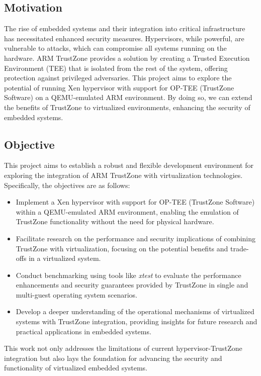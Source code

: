 \documentclass[acmtog]{acmart}
\begin{document}
\subsection{Motivation}
The rise of embedded systems and their integration into critical infrastructure has necessitated enhanced security measures. Hypervisors, while powerful, are vulnerable to attacks, which can compromise all systems running on the hardware. ARM TrustZone provides a solution by creating a Trusted Execution Environment (TEE) that is isolated from the rest of the system, offering protection against privileged adversaries. This project aims to explore the potential of running Xen hypervisor with support for OP-TEE (TrustZone Software) on a QEMU-emulated ARM environment. By doing so, we can extend the benefits of TrustZone to virtualized environments, enhancing the security of embedded systems.



\subsection{Objective}
This project aims to establish a robust and flexible development environment for exploring the integration of ARM TrustZone with virtualization technologies. Specifically, the objectives are as follows:
\begin{itemize}
    \item Implement a Xen hypervisor with support for OP-TEE (TrustZone Software) within a QEMU-emulated ARM environment, enabling the emulation of TrustZone functionality without the need for physical hardware.
    \item Facilitate research on the performance and security implications of combining TrustZone with virtualization, focusing on the potential benefits and trade-offs in a virtualized system.
    \item Conduct benchmarking using tools like \textit{xtest} to evaluate the performance enhancements and security guarantees provided by TrustZone in single and multi-guest operating system scenarios.
    \item Develop a deeper understanding of the operational mechanisms of virtualized systems with TrustZone integration, providing insights for future research and practical applications in embedded systems.
\end{itemize}
This work not only addresses the limitations of current hypervisor-TrustZone integration but also lays the foundation for advancing the security and functionality of virtualized embedded systems.
\end{document}
